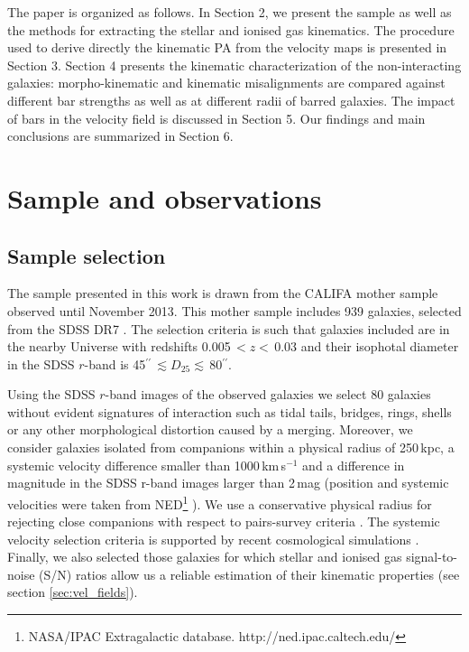 \documentclass[longauth,traditabstract]{aa}
\begin{document}
The paper is organized as follows. In Section 2, we present the sample as well as the methods for extracting the stellar and ionised gas kinematics. The procedure used to derive directly the kinematic PA from the velocity maps is presented in Section 3. Section 4 presents the kinematic characterization of the non-interacting galaxies: morpho-kinematic and kinematic misalignments are compared against different bar strengths as well as at different radii of barred galaxies. The impact of bars in the velocity field is discussed in Section 5. Our findings and main conclusions are summarized in Section 6.

\section{Sample and observations}

\subsection{Sample selection}
\label{sec:sample}

The sample presented in this work is drawn from the CALIFA mother sample
\citep[][]{2012A&A...538A...8S} observed until November 2013. This mother sample includes 939 galaxies, selected from the SDSS DR7 \citep{2009ApJS..182..543A}. The selection criteria is such that galaxies included are in the nearby Universe with redshifts  0.005\,$<z<$\,0.03 and their isophotal diameter in the SDSS $r$-band is 
45$^{\prime\prime}$\,$\lesssim D_{25}\lesssim$\,80$^{\prime\prime}$.

Using the SDSS $r$-band images of the observed galaxies we select 80
galaxies without evident signatures of interaction such as tidal
tails, bridges, rings, shells or any other morphological distortion caused by
a merging. Moreover, we consider galaxies isolated from companions
within a physical radius of 250\,kpc, a systemic velocity difference
smaller than 1000\,km\,s$^{-1}$ and a difference in magnitude in the SDSS
r-band images larger than 2\,mag (position and systemic velocities were taken from NED\footnote{NASA/IPAC Extragalactic database. http://ned.ipac.caltech.edu/} ). We use a conservative physical radius for rejecting close companions with respect to pairs-survey criteria \citep[e.g.,][]{2008AJ....135.1877E}. The systemic velocity selection criteria is supported by recent cosmological simulations \citep{2013MNRAS.tmp.2336M}. Finally, we also selected those galaxies for which stellar and ionised gas signal-to-noise (S/N) ratios allow us a reliable estimation of their kinematic properties (see section \ref{sec:vel_fields}).
\end{document}
